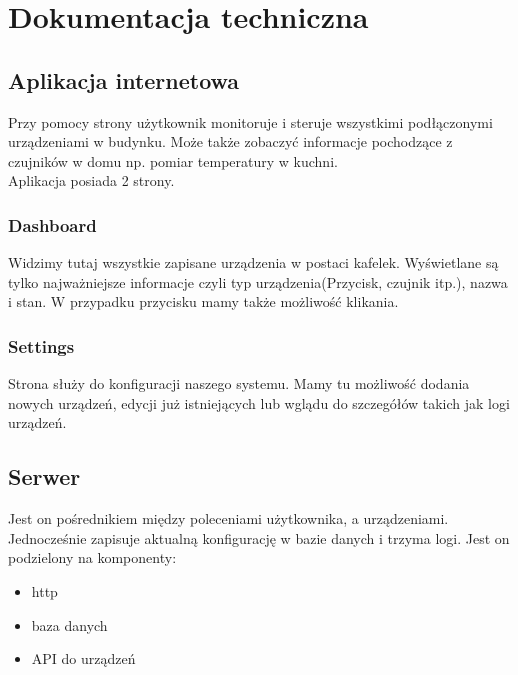 \chapter{Dokumentacja techniczna}%
\section{Aplikacja internetowa}
Przy pomocy strony użytkownik monitoruje i steruje wszystkimi podłączonymi urządzeniami w budynku. Może także zobaczyć informacje pochodzące z czujników w domu np. pomiar temperatury w kuchni. \\
Aplikacja posiada 2 strony.
\subsection{Dashboard}
Widzimy tutaj wszystkie zapisane urządzenia w postaci kafelek. Wyświetlane są tylko najważniejsze informacje czyli typ urządzenia(Przycisk, czujnik itp.), nazwa i stan. W przypadku przycisku mamy także możliwość klikania. 
\subsection{Settings}
Strona służy do konfiguracji naszego systemu. Mamy tu możliwość dodania nowych urządzeń, edycji już istniejących lub wglądu do szczegółów takich jak logi urządzeń.
\section{Serwer}
Jest on pośrednikiem między poleceniami użytkownika, a urządzeniami. Jednocześnie zapisuje aktualną konfigurację w bazie danych i trzyma logi. Jest on podzielony na komponenty:
\begin{itemize}
    \item http
    \item baza danych
    \item API do urządzeń
\end{itemize}
